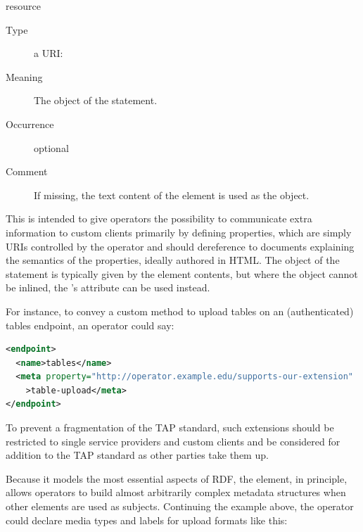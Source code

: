 \documentclass{ivoa}
\begin{document}
\begin{generated}
\begin{bigdescription}
\begin{description}
\end{description}
\item[resource]
\begin{description}
\item[Type] a URI: 
\item[Meaning] 
              The object of the statement.
            
\item[Occurrence] optional
\item[Comment] 
              If missing, the text content of the element is used as the
              object.
            
\end{description}


\end{bigdescription}\endgroup

\endgroup
\end{generated}


This is intended to give operators the possibility to communicate extra
information to custom clients primarily by defining properties, which
are simply URIs controlled by the operator and should dereference to
documents explaining the semantics of the properties, ideally authored
in HTML.  The object of the statement is typically given by the element
contents, but where the object cannot be inlined, the 's
 attribute can be used instead.

For instance, to convey a custom method to upload tables on an
(authenticated) tables endpoint, an operator could say:

\begin{lstlisting}[language=XML, basicstyle=\footnotesize]
<endpoint>
  <name>tables</name>
  <meta property="http://operator.example.edu/supports-our-extension"
    >table-upload</meta>
</endpoint>
\end{lstlisting}

To prevent a fragmentation of the TAP standard, such extensions should
be restricted to single service providers and custom clients and be
considered for addition to the TAP standard as other parties take them
up.

Because it models the most essential aspects of RDF, the 
element, in principle, allows operators to build almost arbitrarily
complex metadata structures when other  elements are used as
subjects.  Continuing the example above, the operator could declare
media types and labels for upload formats like this:
\end{document}

